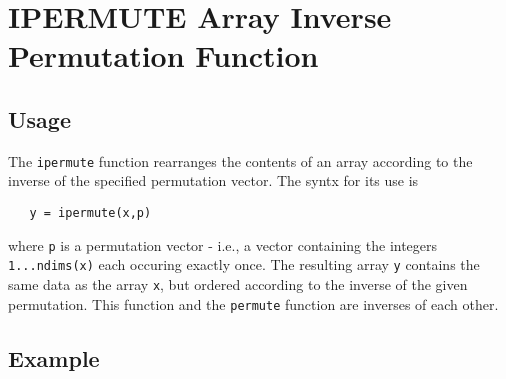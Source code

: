 \section{IPERMUTE Array Inverse Permutation Function}

\subsection{Usage}

The \verb|ipermute| function rearranges the contents of an array according
to the inverse of the specified permutation vector.  The syntx for 
its use is
\begin{verbatim}
   y = ipermute(x,p)
\end{verbatim}
where \verb|p| is a permutation vector - i.e., a vector containing the 
integers \verb|1...ndims(x)| each occuring exactly once.  The resulting
array \verb|y| contains the same data as the array \verb|x|, but ordered
according to the inverse of the given permutation.  This function and
the \verb|permute| function are inverses of each other.
\subsection{Example}

